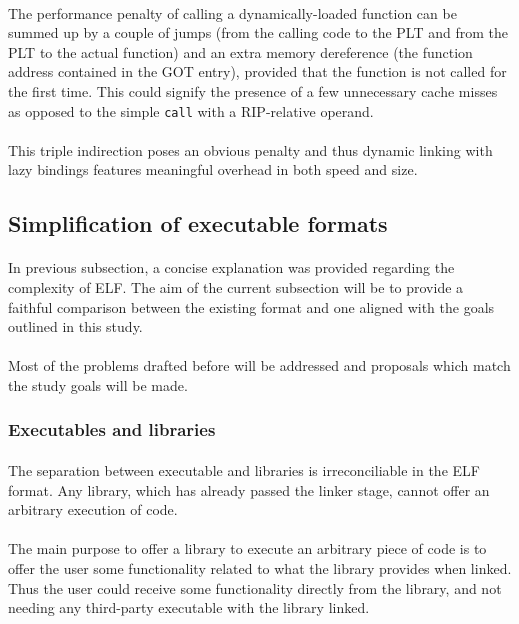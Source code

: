 \documentclass[12pt]{article}
\begin{document}
	\paragraph{}The performance penalty of calling a dynamically-loaded function can be summed up by a couple of jumps (from the calling code to the PLT and from the PLT to the actual function) and an extra memory dereference (the function address contained in the GOT entry), provided that the function is not called for the first time. This could signify the presence of a few unnecessary cache misses as opposed to the simple \verb|call| with a RIP-relative operand.
	\paragraph{}This triple indirection poses an obvious penalty and thus dynamic linking with lazy bindings features meaningful overhead in both speed and size.
	
	\subsection{Simplification of executable formats}
	\paragraph{}In previous subsection, a concise explanation was provided regarding the complexity of ELF. The aim of the current subsection will be to provide a faithful comparison between the existing format and one aligned with the goals outlined in this study.
	\paragraph{}Most of the problems drafted before will be addressed and proposals which match the study goals will be made.
	
	\subsubsection{Executables and libraries}
	
	\paragraph{}The separation between executable and libraries is irreconciliable in the ELF format. Any library, which has already passed the linker stage, cannot offer an arbitrary execution of code.
	\paragraph{}The main purpose to offer a library to execute an arbitrary piece of code is to offer the user some functionality related to what the library provides when linked. Thus the user could receive some functionality directly from the library, and not needing any third-party executable with the library linked.
\end{document}
